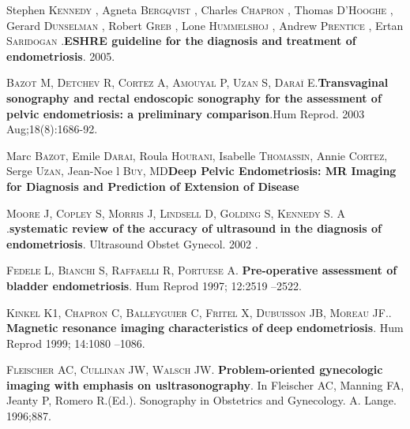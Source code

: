 \documentclass[12pt]{article} %
\begin{document}
\vspace{0,5cm}

Stephen\textsc{ Kennedy} , Agneta\textsc{ Bergqvist}  , Charles \textsc{Chapron}  , Thomas\textsc{ D’Hooghe}  , Gerard\textsc{ Dunselman}  , Robert\textsc{ Greb}  , Lone\textsc{ Hummelshoj}  , Andrew \textsc{Prentice}  , Ertan\textsc{ Saridogan} .\textbf{ESHRE guideline for the diagnosis and treatment of endometriosis}. 2005.

\vspace{0,5cm}

\textsc{Bazot M, Detchev R, Cortez A, Amouyal P, Uzan S, Daraï E}.\textbf{Transvaginal sonography and rectal endoscopic sonography for the assessment of pelvic endometriosis: a preliminary comparison}.Hum Reprod. 2003 Aug;18(8):1686-92.

\vspace{0,5cm}

Marc\textsc{ Bazot}, Emile \textsc{Darai}, Roula\textsc{ Hourani}, Isabelle \textsc{Thomassin}, Annie\textsc{ Cortez}, Serge\textsc{ Uzan}, 
Jean-Noe l\textsc{ Buy}, MD\textbf{Deep Pelvic Endometriosis: MR Imaging for Diagnosis and Prediction of Extension of Disease }

\vspace{0,5cm}


\textsc{Moore J, Copley S, Morris J, Lindsell D, Golding S, Kennedy S. A} .\textbf{systematic review of the accuracy of ultrasound in the diagnosis of endometriosis}. Ultrasound Obstet Gynecol. 2002 .

\vspace{0,5cm}

\textsc{Fedele L, Bianchi S, Raffaelli R, Portuese A}. \textbf{Pre-operative assessment of bladder endometriosis}. Hum Reprod 1997; 12:2519 –2522.

\vspace{0,5cm}

\textsc{Kinkel K1, Chapron C, Balleyguier C, Fritel X, Dubuisson JB, Moreau JF}.. \textbf{Magnetic resonance imaging characteristics of deep endometriosis}. Hum Reprod 1999; 14:1080 –1086.

\vspace{0,5cm}

\textsc{Fleischer AC, Cullinan JW, Walsch JW}.\textbf{ Problem-oriented gynecologic imaging with emphasis on usltrasonography}. In Fleischer AC, Manning FA, Jeanty P, Romero R.(Ed.). Sonography in Obstetrics and Gynecology. A.
Lange. 1996;887.

\vspace{0,5cm}
\end{document}
